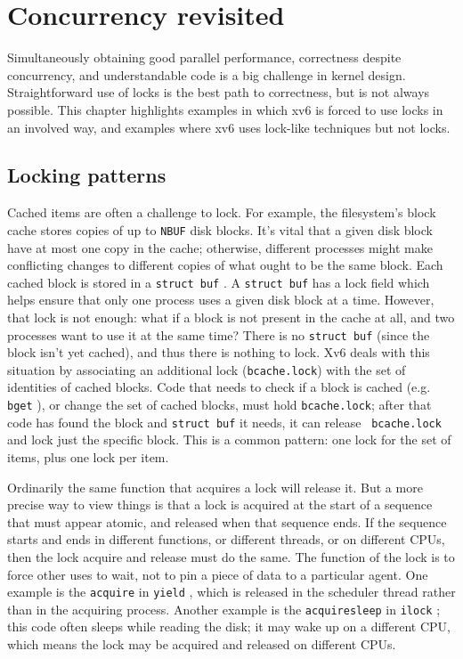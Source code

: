 \chapter{Concurrency revisited}
\label{CH:LOCK2}

Simultaneously obtaining good parallel
performance, correctness despite concurrency, and understandable code
is a big challenge in kernel design.
Straightforward use of locks is the best path to correctness,
but is not always possible.
This
chapter highlights examples in which xv6 is forced to use locks in an
involved way, and examples where xv6 uses lock-like techniques but not
locks.

\section{Locking patterns}

Cached items are often a challenge to lock.
For example,
the filesystem's block cache  stores
copies of up to {\tt NBUF} disk blocks.
It's vital that a given disk block have at most
one copy in the cache; otherwise, different processes might make
conflicting changes to different copies of what ought to be the same
block. Each cached block is stored in a {\tt struct buf}
. A {\tt struct buf} has a lock field which
helps ensure that only one process uses a given disk block at a time.
However, that lock is not enough: what if a block is not present in
the cache at all, and two processes want to use it at the same time?
There is no {\tt struct buf} (since the block isn't yet cached), and
thus there is nothing to lock. Xv6 deals with this situation by
associating an additional lock ({\tt bcache.lock}) with the set of
identities of cached blocks. Code that needs to check if a block is
cached (e.g. {\tt bget} ), or change the
set of cached blocks, must hold {\tt bcache.lock}; after that code has
found the block and {\tt struct buf} it needs, it can release {\tt
  bcache.lock} and lock just the specific block. This is a common
pattern: one lock for the set of items, plus one lock per item.

Ordinarily the same function that acquires a lock will release it. But
a more precise way to view things is that a lock is acquired at the
start of a sequence that must appear atomic, and released when that
sequence ends. If the sequence starts and ends in different functions,
or different threads, or on different CPUs, then the lock acquire and
release must do the same. The function of the lock is to force
other uses to wait, not to pin a piece of data to a particular agent. One
example is the {\tt acquire} in {\tt yield}
, which is released in the scheduler
thread rather than in the acquiring process. Another example is the
{\tt acquiresleep} in {\tt ilock} ; this
code often sleeps while reading the disk; it may wake up on a
different CPU, which means the lock may be acquired
and released on different CPUs.

